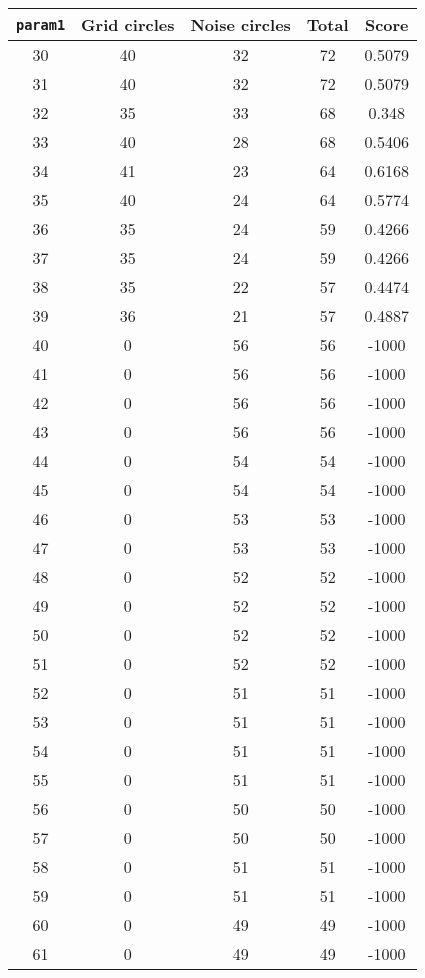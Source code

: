 \documentclass[letterpaper, 12pt]{article}
\begin{document}
\begin{longtable}{|c|c|c|c|c|}
\hline
\textbf{\texttt{param1}} & \textbf{Grid circles} & \textbf{Noise circles} & \textbf{Total} & \textbf{Score} \\
\hline
30 & 40 & 32 & 72 & 0.5079 \\
\hline
31 & 40 & 32 & 72 & 0.5079 \\
\hline
32 & 35 & 33 & 68 & 0.348 \\
\hline
33 & 40 & 28 & 68 & 0.5406 \\
\hline
34 & 41 & 23 & 64 & 0.6168 \\
\hline
35 & 40 & 24 & 64 & 0.5774 \\
\hline
36 & 35 & 24 & 59 & 0.4266 \\
\hline
37 & 35 & 24 & 59 & 0.4266 \\
\hline
38 & 35 & 22 & 57 & 0.4474 \\
\hline
39 & 36 & 21 & 57 & 0.4887 \\
\hline
40 & 0 & 56 & 56 & -1000 \\
\hline
41 & 0 & 56 & 56 & -1000 \\
\hline
42 & 0 & 56 & 56 & -1000 \\
\hline
43 & 0 & 56 & 56 & -1000 \\
\hline
44 & 0 & 54 & 54 & -1000 \\
\hline
45 & 0 & 54 & 54 & -1000 \\
\hline
46 & 0 & 53 & 53 & -1000 \\
\hline
47 & 0 & 53 & 53 & -1000 \\
\hline
48 & 0 & 52 & 52 & -1000 \\
\hline
49 & 0 & 52 & 52 & -1000 \\
\hline
50 & 0 & 52 & 52 & -1000 \\
\hline
51 & 0 & 52 & 52 & -1000 \\
\hline
52 & 0 & 51 & 51 & -1000 \\
\hline
53 & 0 & 51 & 51 & -1000 \\
\hline
54 & 0 & 51 & 51 & -1000 \\
\hline
55 & 0 & 51 & 51 & -1000 \\
\hline
56 & 0 & 50 & 50 & -1000 \\
\hline
57 & 0 & 50 & 50 & -1000 \\
\hline
58 & 0 & 51 & 51 & -1000 \\
\hline
59 & 0 & 51 & 51 & -1000 \\
\hline
60 & 0 & 49 & 49 & -1000 \\
\hline
61 & 0 & 49 & 49 & -1000 \\

\end{longtable}
\end{document}
